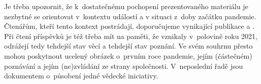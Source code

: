  Je třeba upozornit, že k~dostatečnému pochopení prezentovaného materiálu je nezbytné se orientovat v~kontextu událostí a v situaci z~doby začátku pandemie. Čtenářům, kteří tento kontext postrádají, doporučujeme vynikající publikace \cite{kubal1} a \cite{kubal2}.
 Při čtení příspěvků je též třeba mít na paměti, že vznikaly v~polovině roku 2021, odrážejí tedy tehdejší stav věcí a tehdejší stav poznání. Ve svém souhrnu přesto mohou poskytnout ucelený obrázek o~prvním roce pandemie, jejím (částečném) poznávání a jejím (ne)zvládání ze strany společnosti. V~neposlední řadě jsou dokumentem o~působení jedné vědecké iniciativy.

